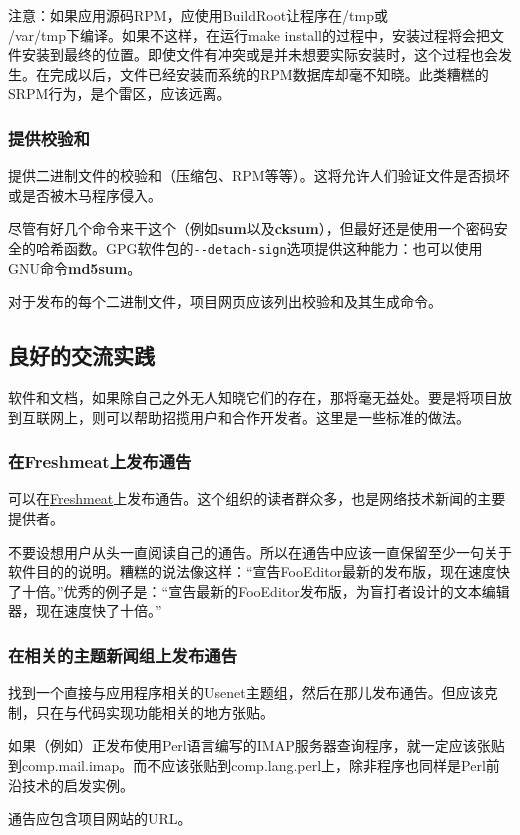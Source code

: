 \documentclass[12pt,oneside]{book}
\begin{document}
注意：如果应用源码RPM，应使用BuildRoot让程序在/tmp或\\ /var/tmp下编译。如果不这样，在运行make install的过程中，安装过程将会把文件安装到最终的位置。即使文件有冲突或是并未想要实际安装时，这个过程也会发生。在完成以后，文件已经安装而系统的RPM数据库却毫不知晓。此类糟糕的SRPM行为，是个雷区，应该远离。

\subsubsection{提供校验和}
提供二进制文件的校验和（压缩包、RPM等等）。这将允许人们验证文件是否损坏或是否被木马程序侵入。

尽管有好几个命令来干这个（例如\textbf{sum}以及\textbf{cksum}），但最好还是使用一个密码安全的哈希函数。GPG软件包的\verb+--detach-sign+选项提供这种能力：也可以使用GNU命令\textbf{md5sum}。

对于发布的每个二进制文件，项目网页应该列出校验和及其生成命令。


\subsection{良好的交流实践}
软件和文档，如果除自己之外无人知晓它们的存在，那将毫无益处。要是将项目放到互联网上，则可以帮助招揽用户和合作开发者。这里是一些标准的做法。

\subsubsection{在Freshmeat上发布通告}
可以在\href{http://www.freshmeat.net/}{Freshmeat}上发布通告。这个组织的读者群众多，也是网络技术新闻的主要提供者。

不要设想用户从头一直阅读自己的通告。所以在通告中应该一直保留至少一句关于软件目的的说明。糟糕的说法像这样：“宣告FooEditor最新的发布版，现在速度快了十倍。”优秀的例子是：“宣告最新的FooEditor发布版，为盲打者设计的文本编辑器，现在速度快了十倍。”

\subsubsection{在相关的主题新闻组上发布通告}
找到一个直接与应用程序相关的Usenet主题组，然后在那儿发布通告。但应该克制，只在与代码实现功能相关的地方张贴。

如果（例如）正发布使用Perl语言编写的IMAP服务器查询程序，就一定应该张贴到comp.mail.imap。而不应该张贴到comp.lang.perl上，除非程序也同样是Perl前沿技术的启发实例。

通告应包含项目网站的URL。
\end{document}
